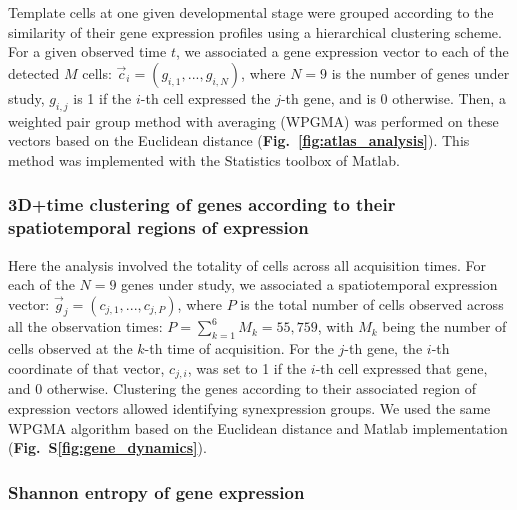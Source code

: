 Template cells at one given developmental stage were grouped according to the similarity of their gene expression profiles using a hierarchical clustering scheme. For a given observed time $t$, we associated a gene expression vector to each of the detected $M$ cells: $\vec{c}_i = (g_{i,1}, ..., g_{i,N})$, where $N=9$ is the number of genes under study, $g_{i,j}$ is 1 if the $i$-th cell expressed the $j$-th gene, and is 0 otherwise. Then, a weighted pair group method with averaging (WPGMA) was performed on these vectors based on the Euclidean distance (\textbf{Fig.~\ref{fig:atlas_analysis}}). This method was implemented with the Statistics toolbox of Matlab.

\subsubsection*{\textbf{3D+time clustering of genes according to their spatiotemporal regions of expression}}

Here the analysis involved the totality of cells across all acquisition times. For each of the $N=9$ genes under study, we associated a spatiotemporal expression vector: $\vec{g}_j = (c_{j,1}, ..., c_{j,P})$, where $P$ is the total number of cells observed across all the observation times: $P=\sum_{k=1}^{6} M_{k} = 55,759$, with $M_k$ being the number of cells observed at the $k$-th time of acquisition. For the $j$-th gene, the $i$-th coordinate of that vector, $c_{j,i}$, was set to 1 if the $i$-th cell expressed that gene, and 0 otherwise. Clustering the genes according to their associated region of expression vectors allowed identifying synexpression groups\cite{niehrs1999synexpression}. We used the same WPGMA algorithm based on the Euclidean distance and Matlab implementation (\textbf{Fig.~S\ref{fig:gene_dynamics}}).

\subsubsection*{\textbf{Shannon entropy of gene expression}}

